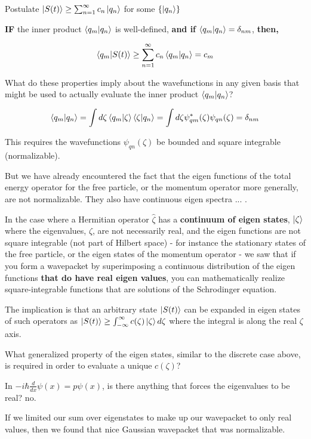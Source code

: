 \documentclass{article}
\begin{document}
Postulate $\ket{S(t)} \geq \sum_{n=1}^\infty c_n \ket{q_n}$ for some $\{\ket{q_n}\}$

\textbf{IF} the inner product $\braket{q_m|q_n}$ is well-defined, \textbf{and if} $\braket{q_m|q_n} = \delta_{nm}$, \textbf{then,}

$$\braket{q_m|S(t)} \geq \sum_{n=1}^\infty c_n \braket{q_m| q_n} = c_m$$


What do these properties imply about the wavefunctions in any given basis that might be used to actually evaluate the inner product $\braket{q_m | q_n}$?

$$\braket{q_m|q_n} = \int d \zeta \braket{q_m|\zeta} \braket{\zeta|q_n} = \int d \zeta \psi^*_{qm} (\zeta) \psi_{qn} (\zeta) = \delta_{nm}$$

This requires the wavefunctions $\psi_{qn}(\zeta)$ be bounded and square integrable (normalizable). 

But we have already encountered the fact that the eigen functions of the total energy operator for the free particle, or the momentum operator more generally, are not normalizable. They also have continuous eigen spectra ... . 


In the case where a Hermitian operator $\hat{\zeta}$ has a \textbf{continuum of eigen states}, $\ket{\zeta}$ where the eigenvalues, $\zeta$, are not necessarily real, and the eigen functions are not square integrable (not part of Hilbert space) - for instance the stationary states of the free particle, or the eigen states of the momentum operator - we saw that if you form a wavepacket by superimposing a continuous distribution of the eigen functions \textbf{that do have real eigen values}, you can mathematically realize square-integrable functions that are solutions of the Schrodinger equation. 

The implication is that an arbitrary state $\ket{S(t)}$ can be expanded in eigen states of such operators as $\ket{S(t)} \geq \int_{- \infty}^\infty c(\zeta) \ket{\zeta} d\zeta$ where the integral is along the real $\zeta$ axis. 

What generalized property of the eigen states, similar to the discrete case above, is required in order to evaluate a unique $c(\zeta)$?

In $-i \hbar \frac{d}{dx} \psi(x) = p \psi(x)$, is there anything that forces the eigenvalues to be real? no. 

If we limited our sum over eigenstates to make up our wavepacket to only real values, then we found that nice Gaussian wavepacket that was normalizable. 
\end{document}
